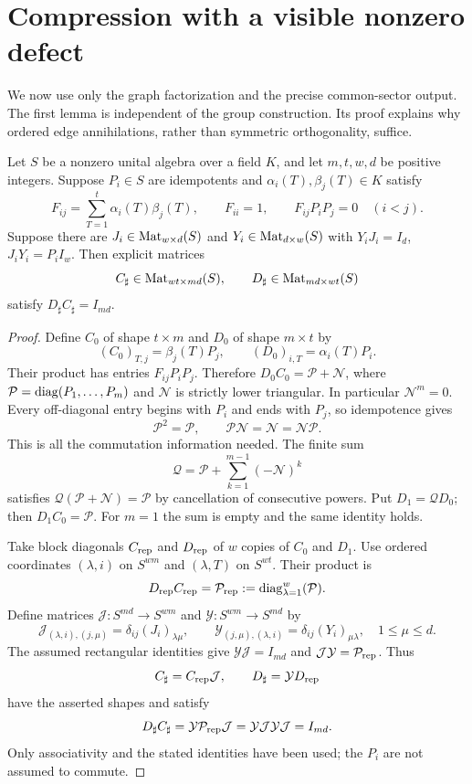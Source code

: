 \section{Compression with a visible nonzero defect}
\label{op:compression-section}

We now use only the graph factorization and the precise common-sector
output. The first lemma is independent of the group construction. Its
proof explains why ordered edge annihilations, rather than symmetric
orthogonality, suffice.

\begin{lemma}\label{op:compression}
Let $S$ be a nonzero unital algebra over a field $K$, and let $m,t,w,d$
be positive integers. Suppose $P_i\in S$ are idempotents and
$\alpha_i(T),\beta_j(T)\in K$ satisfy
\[
 F_{ij}=\sum_{T=1}^t\alpha_i(T)\beta_j(T),\qquad
 F_{ii}=1,\qquad F_{ij}P_iP_j=0\quad(i<j).
\]
Suppose there are $J_i\in\operatorname{Mat}_{w\times d}(S)$ and
$Y_i\in\operatorname{Mat}_{d\times w}(S)$ with
$Y_iJ_i=I_d$, $J_iY_i=P_iI_w$. Then explicit matrices
\[
 C_\sharp\in\operatorname{Mat}_{wt\times md}(S),\qquad
 D_\sharp\in\operatorname{Mat}_{md\times wt}(S)
\]
satisfy $D_\sharp C_\sharp=I_{md}$.
\end{lemma}
\begin{proof}
Define $C_0$ of shape $t\times m$ and $D_0$ of shape $m\times t$ by
\[
 (C_0)_{T,j}=\beta_j(T)P_j,\qquad
 (D_0)_{i,T}=\alpha_i(T)P_i.
\]
Their product has entries $F_{ij}P_iP_j$. Therefore
$D_0C_0=\mathcal P+\mathcal N$, where
$\mathcal P=\operatorname{diag}(P_1,\ldots,P_m)$ and $\mathcal N$ is strictly
lower triangular. In particular $\mathcal N^m=0$. Every off-diagonal
entry begins with $P_i$ and ends with $P_j$, so idempotence gives
\[
 \mathcal P^2=\mathcal P,\qquad
 \mathcal P\mathcal N=\mathcal N=\mathcal N\mathcal P.
\]
This is all the commutation information needed. The finite sum
\[
 \mathcal Q=\mathcal P+\sum_{k=1}^{m-1}(-\mathcal N)^k
\]
satisfies $\mathcal Q(\mathcal P+\mathcal N)=\mathcal P$ by cancellation
of consecutive powers. Put $D_1=\mathcal QD_0$; then
$D_1C_0=\mathcal P$. For $m=1$ the sum is empty and the same identity
holds.

Take block diagonals $C_{\rm rep}$ and $D_{\rm rep}$ of $w$ copies
of $C_0$ and $D_1$. Use ordered coordinates $(\lambda,i)$ on $S^{wm}$
and $(\lambda,T)$ on $S^{wt}$. Their product is
\[
 D_{\rm rep}C_{\rm rep}=\mathcal P_{\rm rep}
 :=\operatorname{diag}_{\lambda=1}^w(\mathcal P).
\]
Define matrices $\mathcal J:S^{md}\to S^{wm}$ and
$\mathcal Y:S^{wm}\to S^{md}$ by
\[
 \mathcal J_{(\lambda,i),(j,\mu)}
     =\delta_{ij}(J_i)_{\lambda\mu},\qquad
 \mathcal Y_{(j,\mu),(\lambda,i)}
     =\delta_{ij}(Y_i)_{\mu\lambda},
 \quad 1\le\mu\le d.
\]
The assumed rectangular identities give
$\mathcal Y\mathcal J=I_{md}$ and
$\mathcal J\mathcal Y=\mathcal P_{\rm rep}$. Thus
\[
 C_\sharp=C_{\rm rep}\mathcal J,\qquad
 D_\sharp=\mathcal YD_{\rm rep}
\]
have the asserted shapes and satisfy
\[
 D_\sharp C_\sharp
 =\mathcal Y\mathcal P_{\rm rep}\mathcal J
 =\mathcal Y\mathcal J\mathcal Y\mathcal J=I_{md}.
\]
Only associativity and the stated identities have been used; the $P_i$
are not assumed to commute.
\end{proof}

